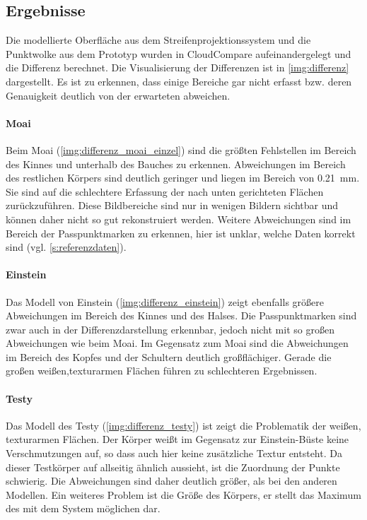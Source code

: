 \documentclass[./00PhotoBox.tex]{subfiles}
\begin{document}
\subsection{Ergebnisse}
Die modellierte Oberfläche aus dem Streifenprojektionssystem und die Punktwolke aus dem Prototyp wurden in CloudCompare aufeinandergelegt und die Differenz berechnet. Die Visualisierung der Differenzen ist in \autoref{img:differenz} dargestellt. Es ist zu erkennen, dass einige Bereiche gar nicht erfasst bzw. deren Genauigkeit deutlich von der erwarteten abweichen.

\paragraph{Moai}
Beim Moai (\autoref{img:differenz_moai_einzel}) sind die größten Fehlstellen im Bereich des Kinnes und unterhalb des Bauches zu erkennen. Abweichungen im Bereich des restlichen Körpers sind deutlich geringer und liegen im Bereich von \SI{0,21}{\milli\metre}. Sie sind auf die schlechtere Erfassung der nach unten gerichteten Flächen zurückzuführen. Diese Bildbereiche sind nur in wenigen Bildern sichtbar und können daher nicht so gut rekonstruiert werden. Weitere Abweichungen sind im Bereich der Passpunktmarken zu erkennen, hier ist unklar, welche Daten korrekt sind (vgl. \autoref{s:referenzdaten}).


\paragraph{Einstein}
Das Modell von Einstein (\autoref{img:differenz_einstein}) zeigt ebenfalls größere Abweichungen im Bereich des Kinnes und des Halses. Die Passpunktmarken sind zwar auch in der Differenzdarstellung erkennbar, jedoch nicht mit so großen Abweichungen wie beim Moai. Im Gegensatz zum Moai sind die Abweichungen im Bereich des Kopfes und der Schultern deutlich großflächiger. Gerade die großen weißen,texturarmen Flächen führen zu schlechteren Ergebnissen.


\paragraph{Testy}
Das Modell des Testy (\autoref{img:differenz_testy}) ist zeigt die Problematik der weißen, texturarmen Flächen. Der Körper weißt im Gegensatz zur Einstein-Büste keine Verschmutzungen auf, so dass auch hier keine zusätzliche Textur entsteht. Da dieser Testkörper auf allseitig ähnlich aussieht, ist die Zuordnung der Punkte schwierig. Die Abweichungen sind daher deutlich größer, als bei den anderen Modellen. Ein weiteres Problem ist die Größe des Körpers, er stellt das Maximum des mit dem System möglichen dar.
\end{document}
